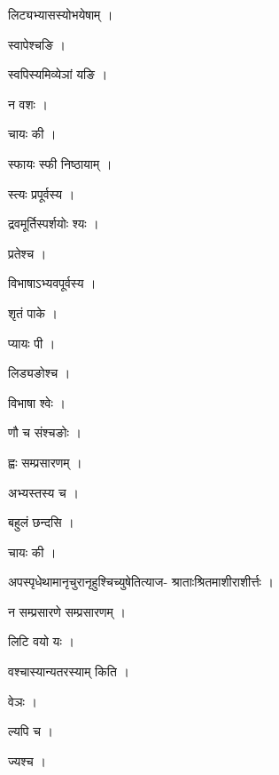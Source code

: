 \documentclass[10pt, openany]{book}
\begin{document}
\noindent लिट्यभ्यासस्योभयेषाम् ।

\noindent स्वापेश्चङि ।

\noindent स्वपिस्यमिव्येञां यङि ।

\noindent न वशः ।

\noindent चायः की ।

\noindent स्फायः स्फी निष्ठायाम् ।

\noindent स्त्यः प्रपूर्वस्य ।

\noindent द्रवमूर्तिस्पर्शयोः श्यः ।

\noindent प्रतेश्च ।

\noindent विभाषाऽभ्यवपूर्वस्य ।

\noindent श‍ृतं पाके ।

\noindent प्यायः पी ।

\noindent लिड्यङोश्च ।

\noindent विभाषा श्वेः ।

\noindent णौ च संश्चङोः ।

\noindent ह्वः सम्प्रसारणम् ।

\noindent अभ्यस्तस्य च ।

\noindent बहुलं छन्दसि ।

\noindent चायः की ।

\noindent अपस्पृधेथामानृचुरानृहुश्चिच्युषेतित्याज- श्राताःश्रितमाशीराशीर्त्तः ।

\noindent न सम्प्रसारणे सम्प्रसारणम् ।

\noindent लिटि वयो यः ।

\noindent वश्चास्यान्यतरस्याम् किति ।

\noindent वेञः ।

\noindent ल्यपि च ।

\noindent ज्यश्च ।
\end{document}
